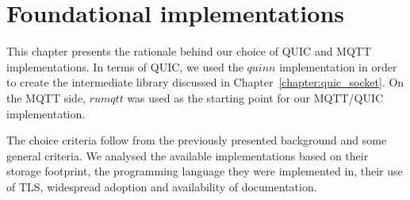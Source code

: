 \chapter{Foundational implementations}\label{chap:libs}

This chapter presents the rationale behind our choice of QUIC and MQTT implementations.
In terms of QUIC, we used the $quinn$ implementation in order to create the intermediate library discussed in Chapter~\ref{chapter:quic_socket}.
On the MQTT side, $rumqtt$ was used as the starting point for our MQTT/QUIC implementation.

The choice criteria follow from the previously presented background and some general criteria.
We analysed the available implementations based on their storage footprint, the programming language they were implemented in, their use of TLS, widespread adoption and availability of documentation.


